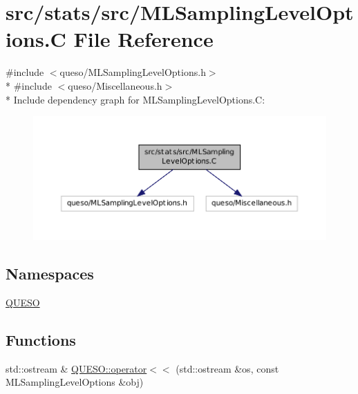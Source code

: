 \hypertarget{_m_l_sampling_level_options_8_c}{\section{src/stats/src/\-M\-L\-Sampling\-Level\-Options.C File Reference}
\label{_m_l_sampling_level_options_8_c}
}
{\ttfamily \#include $<$queso/\-M\-L\-Sampling\-Level\-Options.\-h$>$}\\*
{\ttfamily \#include $<$queso/\-Miscellaneous.\-h$>$}\\*
Include dependency graph for M\-L\-Sampling\-Level\-Options.\-C\-:
\nopagebreak
\begin{figure}[H]
\begin{center}
\leavevmode
\includegraphics[width=350pt]{_m_l_sampling_level_options_8_c__incl}
\end{center}
\end{figure}
\subsection*{Namespaces}
\begin{DoxyCompactItemize}
\item 
\hyperlink{namespace_q_u_e_s_o}{Q\-U\-E\-S\-O}
\end{DoxyCompactItemize}
\subsection*{Functions}
\begin{DoxyCompactItemize}
\item 
std\-::ostream \& \hyperlink{namespace_q_u_e_s_o_a81f910061e4d4ba4b3f823ffc3cc04dc}{Q\-U\-E\-S\-O\-::operator$<$$<$} (std\-::ostream \&os, const M\-L\-Sampling\-Level\-Options \&obj)
\end{DoxyCompactItemize}

